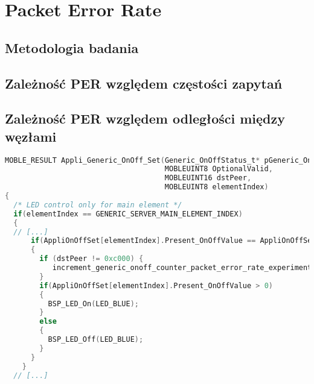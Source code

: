 \section{Packet Error Rate}
\subsection{Metodologia badania}
\subsection{Zależność PER względem częstości zapytań}
\subsection{Zależność PER względem odległości między węzłami}


\begin{lstlisting}[language=C,
    caption={Testowy kod C},
    label={lst:kod cpp}]
MOBLE_RESULT Appli_Generic_OnOff_Set(Generic_OnOffStatus_t* pGeneric_OnOffParam, 
                                     MOBLEUINT8 OptionalValid,
                                     MOBLEUINT16 dstPeer,
                                     MOBLEUINT8 elementIndex)
{
  /* LED control only for main element */
  if(elementIndex == GENERIC_SERVER_MAIN_ELEMENT_INDEX)
  {
  // [...]
      if(AppliOnOffSet[elementIndex].Present_OnOffValue == AppliOnOffSet[elementIndex].TargetValue)
      {
    	if (dstPeer != 0xc000) {
    	   increment_generic_onoff_counter_packet_error_rate_experiment(AppliOnOffSet[elementIndex].Present_OnOffValue, dstPeer);
    	}
        if(AppliOnOffSet[elementIndex].Present_OnOffValue > 0)
        {
          BSP_LED_On(LED_BLUE);
        }
        else
        {
          BSP_LED_Off(LED_BLUE);
        }
      }
    }  
  // [...]
\end{lstlisting}

